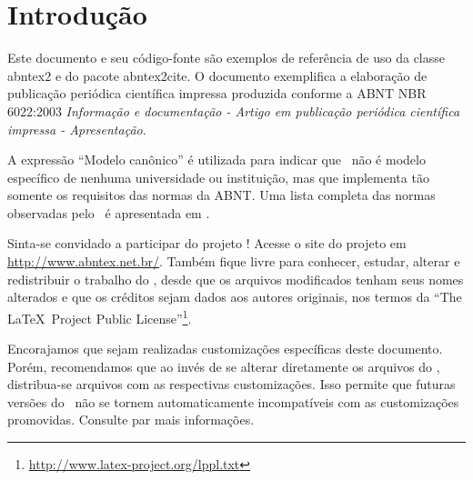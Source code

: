 \documentclass[
	article,			%
	12pt,				%
	twoside,			%
	a4paper,			%
	english,			%
	brazil,				%
	sumario=tradicional
	]{abntex2-modelo-notas-de-aula}
\begin{document}

\frenchspacing 


\imprimircapaUFSC 



\tableofcontents*
\cleardoublepage

\textual
\pagestyle{notasUFSC}




\section*{Introdução}

Este documento e seu código-fonte são exemplos de referência de uso da classe
\textsf{abntex2} e do pacote \textsf{abntex2cite}. O documento exemplifica a
elaboração de publicação periódica científica impressa produzida conforme a ABNT
NBR 6022:2003 \emph{Informação e documentação - Artigo em publicação periódica
científica impressa - Apresentação}.

A expressão ``Modelo canônico'' é utilizada para indicar que \abnTeX\ não é
modelo específico de nenhuma universidade ou instituição, mas que implementa tão
somente os requisitos das normas da ABNT. Uma lista completa das normas
observadas pelo \abnTeX\ é apresentada em .

Sinta-se convidado a participar do projeto \abnTeX! Acesse o site do projeto em
\url{http://www.abntex.net.br/}. Também fique livre para conhecer,
estudar, alterar e redistribuir o trabalho do \abnTeX, desde que os arquivos
modificados tenham seus nomes alterados e que os créditos sejam dados aos
autores originais, nos termos da ``The \LaTeX\ Project Public
License''\footnote{\url{http://www.latex-project.org/lppl.txt}}.

Encorajamos que sejam realizadas customizações específicas deste documento.
Porém, recomendamos que ao invés de se alterar diretamente os arquivos do
\abnTeX, distribua-se arquivos com as respectivas customizações. Isso permite
que futuras versões do \abnTeX~não se tornem automaticamente incompatíveis com
as customizações promovidas. Consulte 
par mais informações.
\end{document}
